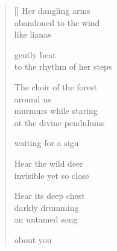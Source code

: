 \documentclass[12pt,a4paper]{article}
\begin{document}
\thispagestyle{empty}

\poemtitle{}

\settowidth{\versewidth}{to the rhythm of her steps}

\bigskip

\begin{verse}[\versewidth]
  Her dangling arms \\
  abandoned to the wind \\
  like lianas

  gently beat \\
  to the rhythm of her steps

  The choir of the forest \\
  around us \\
  murmurs while staring \\
  at the divine pendulums

  waiting for a sign

  Hear the wild deer \\
  invisible yet so close

  Hear its deep chest \\
  darkly drumming \\
  an untamed song

  about you
\end{verse}
\end{document}
